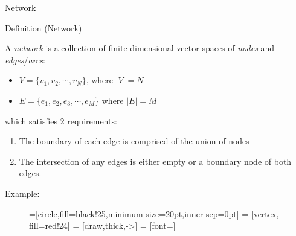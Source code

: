 \documentclass[10pt,ignorenonframetext,mathserif]{beamer}
\providecommand{\tightlist}{%
  \setlength{\itemsep}{0pt}\setlength{\parskip}{0pt}}
\begin{document}
\begin{frame}{Network}

\begin{block}{Definition (Network)}

A \emph{network} is a collection of finite-dimensional vector spaces of
\emph{nodes} and \emph{edges}/\emph{arcs}:

\begin{itemize}
\tightlist
\item
  \(V = \{v_1, v_2, \cdots, v_N \}\), where \(|V| = N\)
\item
  \(E = \{e_1, e_2, e_3, \cdots, e_M \}\) where \(|E| = M\)
\end{itemize}

which satisfies 2 requirements:

\begin{enumerate}
\def\labelenumi{\arabic{enumi}.}
\tightlist
\item
  The boundary of each edge is comprised of the union of nodes
\item
  The intersection of any edges is either empty or a boundary node of
  both edges.
\end{enumerate}

\end{block}

\end{frame}

\begin{frame}{Example:}

\begin{figure}[h]
=[circle,fill=black!25,minimum size=20pt,inner sep=0pt]
 = [vertex, fill=red!24]
 = [draw,thick,->]
 = [font=\small]

\end{figure}

\end{frame}
\end{document}
